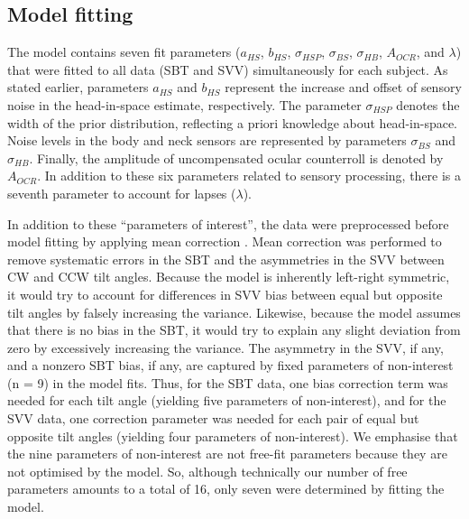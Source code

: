 \subsection{Model fitting}

The model contains seven fit parameters ($a_{HS}$, $b_{HS}$, $\sigma_{HSP}$, $\sigma_{BS}$, $\sigma_{HB}$, $A_{OCR}$, and $\lambda$) that were fitted to all data (SBT and SVV) simultaneously for each subject. As stated earlier, parameters $a_{HS}$ and $b_{HS}$ represent the increase and offset of sensory noise in the head-in-space estimate, respectively. The parameter $\sigma_{HSP}$ denotes the width of the prior distribution, reflecting a priori knowledge about head-in-space. Noise levels in the body and neck sensors are represented by parameters $\sigma_{BS}$ and $\sigma_{HB}$. Finally, the amplitude of uncompensated ocular counterroll is denoted by $A_{OCR}$. In addition to these six parameters related to sensory processing, there is a seventh parameter to account for lapses ($\lambda$).

In addition to these ``parameters of interest'', the data were preprocessed before model fitting by applying mean correction \cite{mcguire2009}. Mean correction was performed to remove systematic errors in the SBT and the asymmetries in the SVV between CW and CCW tilt angles. Because the model is inherently left-right symmetric, it would try to account for differences in SVV bias between equal but opposite tilt angles by falsely increasing the variance. Likewise, because the model assumes that there is no bias in the SBT, it would try to explain any slight deviation from zero by excessively increasing the variance. The asymmetry in the SVV, if any, and a nonzero SBT bias, if any, are captured by fixed parameters of non-interest (n = 9) in the model fits. Thus, for the SBT data, one bias correction term was needed for each tilt angle (yielding five parameters of non-interest), and for the SVV data, one correction parameter was needed for each pair of equal but opposite tilt angles (yielding four parameters of non-interest). We emphasise that the nine parameters of non-interest are not free-fit parameters because they are not optimised by the model. So, although technically our number of free parameters amounts to a total of 16, only seven were determined by fitting the model.

